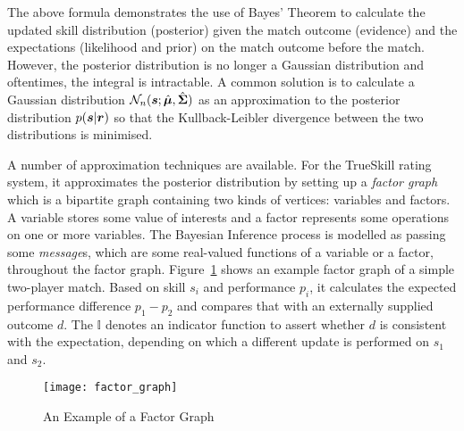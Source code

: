 The above formula demonstrates the use of Bayes' Theorem to calculate the updated skill distribution (posterior) given the match outcome (evidence) and the expectations (likelihood and prior) on the match outcome before the match. However, the posterior distribution is no longer a Gaussian distribution and oftentimes, the integral is intractable. A common solution is to calculate a Gaussian distribution $\mathcal{N}_{n}(\bm{s}; \hat{\bm{\mu}}, \hat{\bm{\Sigma}})$ as an approximation to the posterior distribution $p(\bm{s} | \bm{r})$ so that the Kullback-Leibler divergence between the two distributions is minimised. 

A number of approximation techniques are available. For the TrueSkill rating system, it approximates the posterior distribution by setting up a \emph{factor graph} which is a bipartite graph containing two kinds of vertices: variables and factors. A variable stores some value of interests and a factor represents some operations on one or more variables. The Bayesian Inference process is modelled as passing some \emph{message}s, which are some real-valued functions of a variable or a factor, throughout the factor graph. Figure~\ref{Fig:fact_grph} shows an example factor graph of a simple two-player match. Based on skill $s_{i}$ and performance $p_{i}$, it calculates the expected performance difference $p_{1} - p_{2}$ and compares that with an externally supplied outcome $d$. The $\mathbb{I}$ denotes an indicator function to assert whether $d$ is consistent with the expectation, depending on which a different update is performed on $s_{1}$ and $s_{2}$. 

\begin{figure}[h!]
\texttt{[image: factor\_graph]}
\centering
\caption{An Example of a Factor Graph}\label{Fig:fact_grph}
\end{figure}

